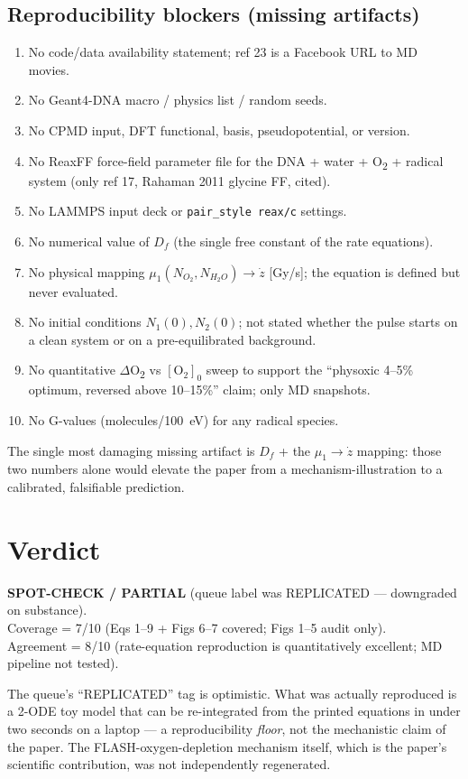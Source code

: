 \documentclass[11pt]{article}
\begin{document}
\subsection*{Reproducibility blockers (missing artifacts)}
\begin{enumerate}
\item No code/data availability statement; ref 23 is a Facebook URL to MD movies.
\item No Geant4-DNA macro / physics list / random seeds.
\item No CPMD input, DFT functional, basis, pseudopotential, or version.
\item No ReaxFF force-field parameter file for the DNA + water + O\textsubscript{2} + radical system (only ref 17, Rahaman 2011 glycine FF, cited).
\item No LAMMPS input deck or \texttt{pair\_style reax/c} settings.
\item No numerical value of $D_f$ (the single free constant of the rate equations).
\item No physical mapping $\mu_1(N_{O_2},N_{H_2O})\to \dot z$ [Gy/s]; the equation is defined but never evaluated.
\item No initial conditions $N_1(0), N_2(0)$; not stated whether the pulse starts on a clean system or on a pre-equilibrated background.
\item No quantitative $\Delta$O\textsubscript{2} vs $[\text{O}_2]_0$ sweep to support the ``physoxic 4--5\% optimum, reversed above 10--15\%'' claim; only MD snapshots.
\item No G-values (molecules/100~eV) for any radical species.
\end{enumerate}

The single most damaging missing artifact is $D_f$ + the $\mu_1\to\dot z$ mapping: those two numbers alone would elevate the paper from a mechanism-illustration to a calibrated, falsifiable prediction.

\section{Verdict}
\textbf{SPOT-CHECK / PARTIAL} (queue label was REPLICATED --- downgraded on substance).\\
Coverage = 7/10 (Eqs 1--9 + Figs 6--7 covered; Figs 1--5 audit only).\\
Agreement = 8/10 (rate-equation reproduction is quantitatively excellent; MD pipeline not tested).

The queue's ``REPLICATED'' tag is optimistic. What was actually reproduced is a 2-ODE toy model that can be re-integrated from the printed equations in under two seconds on a laptop --- a reproducibility \emph{floor}, not the mechanistic claim of the paper. The FLASH-oxygen-depletion mechanism itself, which is the paper's scientific contribution, was not independently regenerated.


\end{document}
